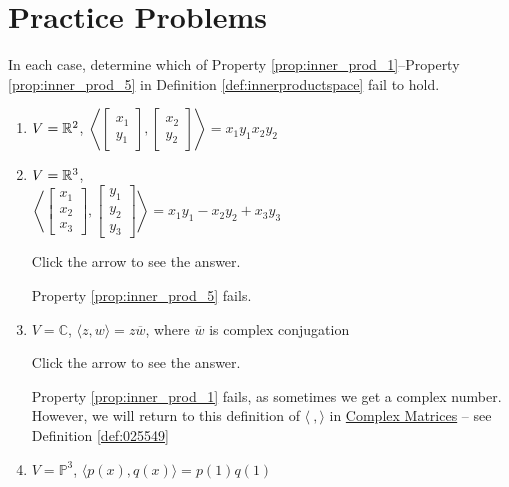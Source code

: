 \documentclass{ximera}
\begin{document}
\section*{Practice Problems}

\begin{problem}\label{prob:inner_prod_1}
In each case, determine which of  Property \ref{prop:inner_prod_1}--Property \ref{prop:inner_prod_5} in Definition \ref{def:innerproductspace} fail to hold.

\begin{enumerate} 
\item $V = \mathbb{R}^2$, $\left\langle \begin{bmatrix}x_1\\ y_1\end{bmatrix}, \begin{bmatrix}x_2\\ y_2\end{bmatrix} \right\rangle = x_1y_1x_2y_2$

\item $V = \mathbb{R}^3$, \\$\left\langle \begin{bmatrix}x_1\\ x_2\\ x_3\end{bmatrix}, \begin{bmatrix}y_1\\ y_2\\ y_3\end{bmatrix} \right\rangle = x_1y_1 - x_2y_2 + x_3y_3$

Click the arrow to see the answer.
\begin{expandable}{}{}
Property \ref{prop:inner_prod_5} fails.
\end{expandable}

\item $V = \mathbb{C}$, $\langle z, w \rangle = z\overline{w}$, where $\overline{w}$ is complex
conjugation

Click the arrow to see the answer.
\begin{expandable}{}{}
Property \ref{prop:inner_prod_1} fails, as sometimes we get a complex number.  However, we will return to this definition of $\langle\ , \rangle$ in \href{https://ximera.osu.edu/linearalgebradzv3/LinearAlgebraInteractiveIntro/RTH-0050/main}{Complex Matrices} -- see Definition \ref{def:025549}
\end{expandable}

\item $V = \mathbb{P}^3$, $\langle p(x), q(x) \rangle = p(1)q(1)$


\end{enumerate}
\end{problem}
\end{document}
